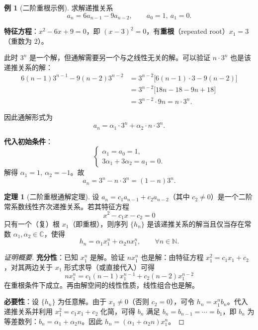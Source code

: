 \documentclass[UTF8,11pt,a4paper]{ctexbook}   %
\theoremstyle{definition}
\newtheorem{theorem}{定理}[section]
\newtheorem{example}{例}[section]
\begin{document}
\begin{example}[二阶重根示例]
求解递推关系
\[
a_n = 6a_{n-1} - 9a_{n-2},\qquad a_0 = 1,\ a_1 = 0.
\]

\textbf{特征方程}：$x^2 - 6x + 9 = 0$，即 $(x-3)^2 = 0$，有\textbf{重根}（repeated root）$x_1 = 3$（重数为 $2$）。

此时 $3^n$ 是一个解，但通解需要另一个与之线性无关的解。可以验证 $n \cdot 3^n$ 也是该递推关系的解：
\begin{align*}
6(n-1)3^{n-1} - 9(n-2)3^{n-2}
&= 3^{n-2}\bigl[6(n-1)\cdot 3 - 9(n-2)\bigr] \\
&= 3^{n-2}\bigl[18n - 18 - 9n + 18\bigr] \\
&= 3^{n-2} \cdot 9n = n \cdot 3^n.
\end{align*}

因此通解形式为
\[
a_n = \alpha_1 \cdot 3^n + \alpha_2 \cdot n \cdot 3^n.
\]

\textbf{代入初始条件}：
\[
\begin{cases}
\alpha_1 = a_0 = 1,\\[0.3em]
3\alpha_1 + 3\alpha_2 = a_1 = 0.
\end{cases}
\]
解得 $\alpha_1 = 1,\ \alpha_2 = -1$。故
\[
a_n = 3^n - n \cdot 3^n = (1-n)3^n.
\]
\end{example}

\begin{theorem}[二阶重根通解定理]
设 $a_n = c_1 a_{n-1} + c_2 a_{n-2}$（其中 $c_2 \neq 0$）是一个二阶常系数线性齐次递推关系。若其特征方程
\[
x^2 - c_1 x - c_2 = 0
\]
只有一个（复）根 $x_1$（即重根），则序列 $\{h_n\}$ 是该递推关系的解当且仅当存在常数 $\alpha_1, \alpha_2 \in \mathbb{C}$，使得
\[
\boxed{h_n = \alpha_1 x_1^n + \alpha_2 n x_1^n,\qquad \forall n \in \mathbb{N}.}
\]
\end{theorem}

\begin{proof}[证明概要]
\textbf{充分性}：已知 $x_1^n$ 是解。验证 $n x_1^n$ 也是解：由特征方程 $x_1^2 = c_1 x_1 + c_2$，对其两边关于 $x_1$ 形式求导（或直接代入）可得
\[
n x_1^n = c_1 (n-1)x_1^{n-1} + c_2 (n-2)x_1^{n-2}
\]
在重根条件下成立。再由解空间的线性性质，线性组合也是解。

\textbf{必要性}：设 $\{h_n\}$ 为任意解。由于 $x_1 \neq 0$（否则 $c_2=0$），可令 $h_n = x_1^n b_n$。代入递推关系并利用 $x_1^2 = c_1 x_1 + c_2$ 化简，可得 $b_n$ 满足 $b_n = b_{n-1} = \cdots = b_1$，即 $b_n$ 为等差数列：$b_n = \alpha_1 + \alpha_2 n$。因此 $h_n = (\alpha_1 + \alpha_2 n)x_1^n$。
\end{proof}
\end{document}
